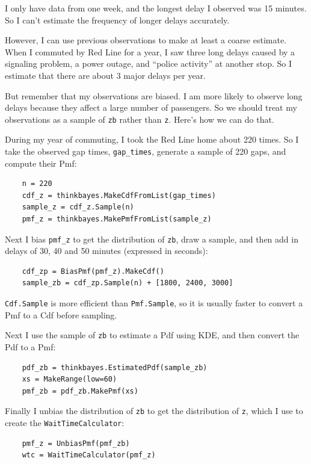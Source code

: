 \documentclass[12pt]{book}
\begin{document}
I only have data from one week,
and the longest delay I observed was 15 minutes.  So I can't
estimate the frequency of longer delays accurately.

However, I can use previous observations to make at least a coarse
estimate.  When I commuted by Red Line for a year, I saw three long
delays caused by a signaling problem, a power outage, and ``police
activity'' at another stop.  So I estimate that there are about
3 major delays per year.

But remember that my observations are biased.  I am more likely
to observe long delays because they affect a large number
of passengers.  So we should treat my observations as a sample
of {\tt zb} rather than {\tt z}.  Here's how we can do that.

During my year of commuting, I took the Red Line home about 220
times.  So I take the observed gap times, \verb"gap_times",
generate a sample of 220 gaps, and compute their Pmf:

\begin{verbatim}
    n = 220
    cdf_z = thinkbayes.MakeCdfFromList(gap_times)
    sample_z = cdf_z.Sample(n)
    pmf_z = thinkbayes.MakePmfFromList(sample_z)
\end{verbatim}

Next I bias \verb"pmf_z" to get the distribution of
{\tt zb}, draw a sample, and then add in delays of
30, 40 and 50 minutes (expressed in seconds):

\begin{verbatim}
    cdf_zp = BiasPmf(pmf_z).MakeCdf()
    sample_zb = cdf_zp.Sample(n) + [1800, 2400, 3000]
\end{verbatim}

{\tt Cdf.Sample} is more efficient than {\tt Pmf.Sample}, so it
is usually faster to convert a Pmf to a Cdf before sampling.

Next I use the sample of {\tt zb} to estimate a Pdf using
KDE, and then convert the Pdf to a Pmf:

\begin{verbatim}
    pdf_zb = thinkbayes.EstimatedPdf(sample_zb)
    xs = MakeRange(low=60)
    pmf_zb = pdf_zb.MakePmf(xs)
\end{verbatim}

Finally I unbias the distribution of {\tt zb} to get the
distribution of {\tt z}, which I use to create the
{\tt WaitTimeCalculator}:

\begin{verbatim}
    pmf_z = UnbiasPmf(pmf_zb)
    wtc = WaitTimeCalculator(pmf_z)
\end{verbatim}
\end{document}
